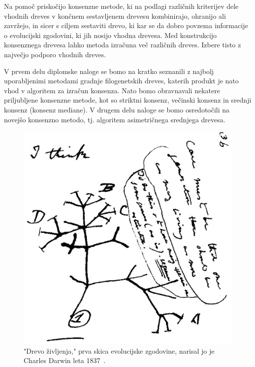 \documentclass[a4paper, 12pt]{book}
\begin{document}
Na pomoč priskočijo konsenzne metode, ki na podlagi različnih  kriterijev dele 
vhodnih dreves v končnem sestavljenem drevesu kombinirajo, ohranijo ali zavržejo,
in sicer s ciljem sestaviti drevo, ki kar se da dobro povzema informacije o evolucijski 
zgodovini, ki jih nosijo vhodna drevesa. Med konstrukcijo konsenznega drevesa lahko 
metoda izračuna več različnih dreves. Izbere tisto z največjo podporo 
vhodnih dreves.

V prvem delu diplomske naloge se bomo na kratko seznanili z najbolj uporabljenimi
metodami gradnje filogenetskih dreves, katerih produkt je nato vhod v algoritem 
za izračun konsenza. Nato bomo obravnavali nekatere priljubljene konsenzne metode, 
kot so striktni konsenz, večinski konsenz in srednji konsenz (konsenz mediane). 
V drugem delu naloge se bomo osredotočili na novejšo konsenzno metodo, tj. algoritem
asimetričnega srednjega drevesa. 

\begin{figure}
	\begin{center}
		\includegraphics[scale=0.45]{gfx/darwin_tree.jpg}
	\end{center}
	\caption{
		"Drevo življenja," prva skica evolucijske zgodovine, narisal jo je 
		Charles Darwin leta 1837~\cite{cd}.
	}
	\label{img-darwin-tree}
\end{figure}
\end{document}
